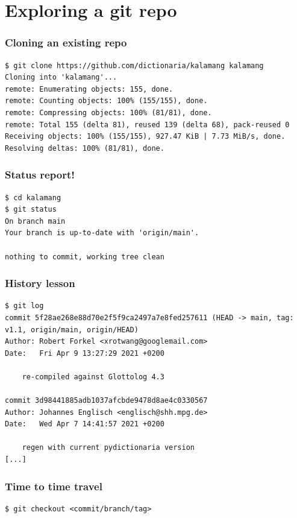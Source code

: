 \documentclass[12pt]{beamer}
\begin{document}
\section{Exploring a git repo}

\begin{frame}[fragile]
  \frametitle{Cloning an existing repo}

  {\footnotesize{}%
    \begin{verbatim}
$ git clone https://github.com/dictionaria/kalamang kalamang
Cloning into 'kalamang'...
remote: Enumerating objects: 155, done.
remote: Counting objects: 100% (155/155), done.
remote: Compressing objects: 100% (81/81), done.
remote: Total 155 (delta 81), reused 139 (delta 68), pack-reused 0
Receiving objects: 100% (155/155), 927.47 KiB | 7.73 MiB/s, done.
Resolving deltas: 100% (81/81), done.
    \end{verbatim}%
  }
\end{frame}

\begin{frame}[fragile]
  \frametitle{Status report!}

  {\footnotesize{}%
    \begin{verbatim}
$ cd kalamang
$ git status
On branch main
Your branch is up-to-date with 'origin/main'.

nothing to commit, working tree clean
    \end{verbatim}%
  }
\end{frame}

\begin{frame}[fragile]
  \frametitle{History lesson}

  {\footnotesize{}%
    \begin{verbatim}
$ git log
commit 5f28ae268e88d70e2f5f9ca2497a7e8fed257611 (HEAD -> main, tag: v1.1, origin/main, origin/HEAD)
Author: Robert Forkel <xrotwang@googlemail.com>
Date:   Fri Apr 9 13:27:29 2021 +0200

    re-compiled against Glottolog 4.3

commit 3d98441885adb1037afcbde9478d8ae4c0330567
Author: Johannes Englisch <englisch@shh.mpg.de>
Date:   Wed Apr 7 14:41:57 2021 +0200

    regen with current pydictionaria version
[...]
    \end{verbatim}%
  }
\end{frame}

\begin{frame}[fragile]
  \frametitle{Time to time travel}

  {\footnotesize{}%
    \begin{verbatim}
$ git checkout <commit/branch/tag>
    \end{verbatim}
  }
\end{frame}
\end{document}
